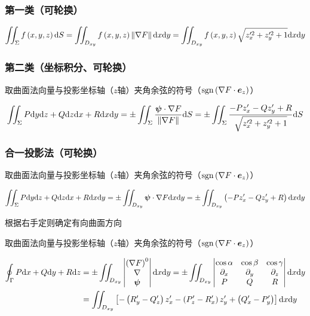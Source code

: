 \documentclass{article}
\begin{document}
\subsubsection{第一类（可轮换）}

\[\iint_\Sigma f\left(x,y,z\right)\mathrm d S=
    \iint_{D_{xy}}f\left(x,y,z\right)\left\Vert\nabla F\right\Vert\mathrm d x\mathrm d y=
    \iint_{D_{xy}}f\left(x,y,z\right)\sqrt{z_x^{\prime 2}+z_y^{\prime 2}+1}\mathrm d x\mathrm d y\]

\subsubsection{第二类（坐标积分、可轮换）}

取曲面法向量与投影坐标轴（$z$轴）夹角余弦的符号（$\mathrm{sgn}\left(\nabla F\cdot \boldsymbol e_z\right)$）

\[\iint_\Sigma P\mathrm d y\mathrm d z+Q\mathrm d z\mathrm d x+R\mathrm d x\mathrm d y=
    \pm\iint_\Sigma\frac{\boldsymbol\psi\cdot\nabla F}{\left\Vert\nabla F\right\Vert}\mathrm d S=
    \pm\iint_\Sigma\frac{-Pz_x^\prime-Qz_y^\prime+R}{\sqrt{z_x^{\prime2}+z_y^{\prime2}+1}}\mathrm d S\]

\subsubsection{合一投影法（可轮换）}

取曲面法向量与投影坐标轴（$z$轴）夹角余弦的符号（$\mathrm{sgn}\left(\nabla F\cdot \boldsymbol{e}_z\right)$）

\[\iint_\Sigma P\mathrm d y\mathrm d z+Q\mathrm d z\mathrm d x+R\mathrm d x\mathrm d y=
    \pm\iint_{D_{xy}}\boldsymbol\psi\cdot\nabla F\mathrm d x\mathrm d y=
    \pm\iint_{D_{xy}}\left(-Pz_x^\prime-Qz_y^\prime+R\right)\mathrm d x\mathrm d y\]

根据右手定则确定有向曲面方向


取曲面法向量与投影坐标轴（$z$轴）夹角余弦的符号（$\mathrm{sgn}\left(\nabla F\cdot \boldsymbol{e}_z\right)$）

\[\begin{aligned}
        \oint_\Gamma P\mathrm d x+Q\mathrm d y+R\mathrm d z
         & =\pm\iint_{D_{xy}}\begin{vmatrix}
                                 \left(\nabla F\right)^0 \\
                                 \nabla         \\
                                 \boldsymbol\psi
                             \end{vmatrix}\mathrm d x\mathrm d y
        =\pm\iint_{D_{xy}}\begin{vmatrix}
                              \cos\alpha & \cos\beta  & \cos\gamma \\
                              \partial_x & \partial_y & \partial_z \\
                              P          & Q          & R
                          \end{vmatrix}\mathrm d x\mathrm d y \\
         & =\iint_{D_{xy}}
        \left[-\left(R_y^\prime-Q_z^\prime\right)z_x^\prime
            -\left(P_z^\prime-R_x^\prime\right)z_y^\prime
            +\left(Q_x^\prime-P_y^\prime\right)\right]\mathrm d x\mathrm d y
    \end{aligned}\]
\end{document}
